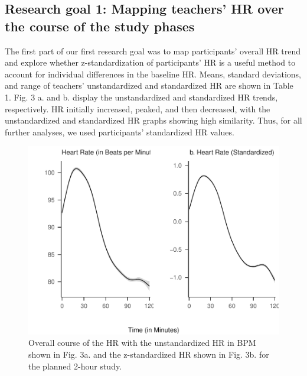 \documentclass[preprint, 3p,
authoryear]{elsarticle} %
\begin{document}
\subsection{Research goal 1: Mapping teachers' HR over the course of the
study
phases}\label{research-goal-1-mapping-teachers-hr-over-the-course-of-the-study-phases}

The first part of our first research goal was to map participants'
overall HR trend and explore whether z-standardization of participants'
HR is a useful method to account for individual differences in the
baseline HR. Means, standard deviations, and range of teachers'
unstandardized and standardized HR are shown in Table 1. Fig. 3 a. and
b. display the unstandardized and standardized HR trends, respectively.
HR initially increased, peaked, and then decreased, with the
unstandardized and standardized HR graphs showing high similarity. Thus,
for all further analyses, we used participants' standardized HR values.



\begin{figure}[htbp]
  \centering
  \includegraphics[width=1\textwidth]{plots_publication/loess_plot_std_unstd_new.pdf}
  \caption{Overall course of the HR with the unstandardized HR in BPM shown in Fig. 3a. and the z-standardized HR shown in Fig. 3b. for the planned 2-hour study.}
  \label{Overall course of the HR with the unstandardized HR in BPM shown in Fig. 3a. and the z-standardized HR shown in Fig. 3b. for the planned 2-hour study.}
\end{figure}


\end{document}
